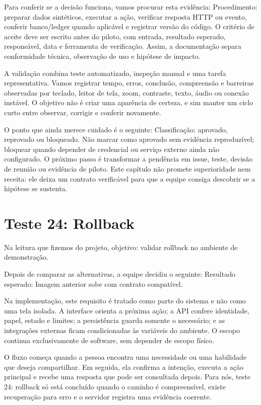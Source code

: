 \documentclass[12pt,oneside,a4paper,article]{abntex2}
\begin{document}
Para conferir se a decisão funciona, vamos procurar esta evidência: Procedimento: preparar dados sintéticos, executar a ação, verificar resposta HTTP ou evento, conferir banco/ledger quando aplicável e registrar versão do código. O critério de aceite deve ser escrito antes do piloto, com entrada, resultado esperado, responsável, data e ferramenta de verificação. Assim, a documentação separa conformidade técnica, observação de uso e hipótese de impacto.

A validação combina teste automatizado, inspeção manual e uma tarefa representativa. Vamos registrar tempo, erros, conclusão, compreensão e barreiras observadas por teclado, leitor de tela, zoom, contraste, texto, áudio ou conexão instável. O objetivo não é criar uma aparência de certeza, e sim manter um ciclo curto entre observar, corrigir e conferir novamente.

O ponto que ainda merece cuidado é o seguinte: Classificação: aprovado, reprovado ou bloqueado. Não marcar como aprovado sem evidência reproduzível; bloquear quando depender de credencial ou serviço externo ainda não configurado. O próximo passo é transformar a pendência em issue, teste, decisão de reunião ou evidência de piloto. Este capítulo não promete superioridade nem receita: ele deixa um contrato verificável para que a equipe consiga descobrir se a hipótese se sustenta.

\section{Teste 24: Rollback}
Na leitura que fizemos do projeto, objetivo: validar rollback no ambiente de demonstração.

Depois de comparar as alternativas, a equipe decidiu o seguinte: Resultado esperado: Imagem anterior sobe com contrato compatível.

Na implementação, este requisito é tratado como parte do sistema e não como uma tela isolada. A interface orienta a próxima ação; a API confere identidade, papel, estado e limites; a persistência guarda somente o necessário; e as integrações externas ficam condicionadas às variáveis do ambiente. O escopo continua exclusivamente de software, sem depender de escopo físico.

O fluxo começa quando a pessoa encontra uma necessidade ou uma habilidade que deseja compartilhar. Em seguida, ela confirma a intenção, executa a ação principal e recebe uma resposta que pode ser consultada depois. Para nós, teste 24: rollback só está concluído quando o caminho é compreensível, existe recuperação para erro e o servidor registra uma evidência coerente.
\end{document}
